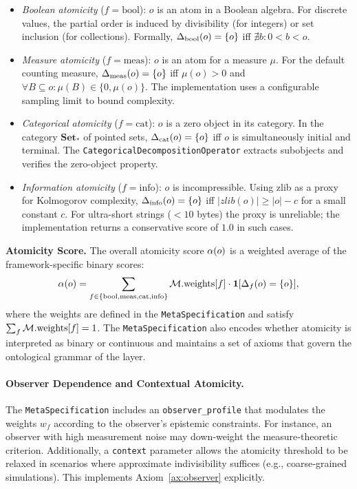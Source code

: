 \begin{itemize}
    \item \textit{Boolean atomicity} ($f=\text{bool}$): $o$ is an atom in a Boolean algebra. For discrete values, the partial order is induced by divisibility (for integers) or set inclusion (for collections). Formally, $\Delta_{\text{bool}}(o) = \{o\}$ iff $\nexists b: 0 < b < o$.
    \item \textit{Measure atomicity} ($f=\text{meas}$): $o$ is an atom for a measure $\mu$. For the default counting measure, $\Delta_{\text{meas}}(o) = \{o\}$ iff $\mu(o) > 0$ and $\forall B \subseteq o: \mu(B) \in \{0, \mu(o)\}$. The implementation uses a configurable sampling limit to bound complexity.
    \item \textit{Categorical atomicity} ($f=\text{cat}$): $o$ is a zero object in its category. In the category $\mathbf{Set}_*$ of pointed sets, $\Delta_{\text{cat}}(o) = \{o\}$ iff $o$ is simultaneously initial and terminal. The \texttt{CategoricalDecompositionOperator} extracts subobjects and verifies the zero-object property.
    \item \textit{Information atomicity} ($f=\text{info}$): $o$ is incompressible. Using zlib as a proxy for Kolmogorov complexity, $\Delta_{\text{info}}(o) = \{o\}$ iff $|zlib(o)| \ge |o| - c$ for a small constant $c$. For ultra-short strings ($<10$ bytes) the proxy is unreliable; the implementation returns a conservative score of $1.0$ in such cases.
\end{itemize}

\textbf{Atomicity Score.} The overall atomicity score $\alpha(o)$ is a weighted average of the framework-specific binary scores:
\[
\alpha(o) = \sum_{f \in \{\text{bool}, \text{meas}, \text{cat}, \text{info}\}} \mathcal{M}.\text{weights}[f] \cdot \mathbf{1}[\Delta_f(o) = \{o\}],
\]
where the weights are defined in the \texttt{MetaSpecification} and satisfy $\sum_f \mathcal{M}.\text{weights}[f] = 1$. The \texttt{MetaSpecification} also encodes whether atomicity is interpreted as binary or continuous and maintains a set of axioms that govern the ontological grammar of the layer.

\paragraph{Observer Dependence and Contextual Atomicity.}
The \texttt{MetaSpecification} includes an \texttt{observer\_profile} that modulates the weights $w_f$ according to the observer's epistemic constraints. For instance, an observer with high measurement noise may down‑weight the measure‑theoretic criterion. Additionally, a \texttt{context} parameter allows the atomicity threshold to be relaxed in scenarios where approximate indivisibility suffices (e.g., coarse‑grained simulations). This implements Axiom~\ref{ax:observer} explicitly.

